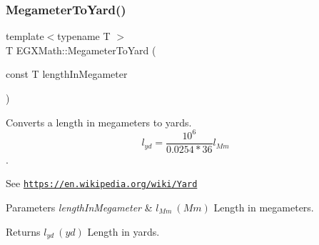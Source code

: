 \subsubsection{\texorpdfstring{Megameter\+To\+Yard()}{MegameterToYard()}}
{\footnotesize\ttfamily template$<$typename T $>$ \\
T E\+G\+X\+Math\+::\+Megameter\+To\+Yard (\begin{DoxyParamCaption}\item[{const T}]{length\+In\+Megameter }\end{DoxyParamCaption})}



Converts a length in megameters to yards. \[ l_{yd}= \frac{10^{6}}{0.0254 * 36} l_{Mm} \]. 

See \href{https://en.wikipedia.org/wiki/Yard}{\tt https\+://en.\+wikipedia.\+org/wiki/\+Yard} 
\begin{DoxyParams}{Parameters}
{\em length\+In\+Megameter} & $ l_{Mm}\ (Mm)$ Length in megameters. \\
\hline
\end{DoxyParams}
\begin{DoxyReturn}{Returns}
$ l_{yd}\ (yd)$ Length in yards. 
\end{DoxyReturn}
